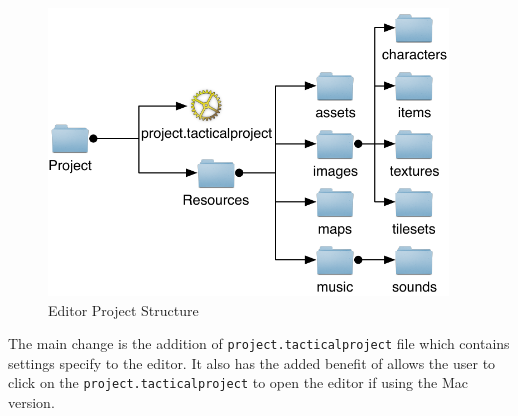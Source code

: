 \begin{figure}[htbp]
	\centering
		\includegraphics[height=3in]{figures/project.pdf}
	\caption{Editor Project Structure}
	\label{fig:figures_project}
\end{figure}

The main change is the addition of \texttt{project.tacticalproject} file which contains settings specify to the editor. It also has the added benefit of allows the user to click on the \texttt{project.tacticalproject} to open the editor if using the Mac version.